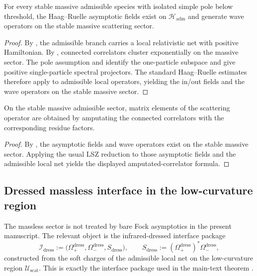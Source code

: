 \begin{theorem}
\label{thm:haag-ruelle-admissible-massive}
For every stable massive admissible species with isolated simple pole below threshold, the
Haag--Ruelle asymptotic fields exist on $\mathcal H_{\mathrm{adm}}$ and generate wave operators on
the stable massive scattering sector.
\end{theorem}

\begin{proof}
By , the admissible
branch carries a local relativistic net with positive Hamiltonian. By
, connected correlators cluster exponentially on the
massive sector. The pole assumption and  identify the
one-particle subspace and give positive single-particle spectral projectors. The standard
Haag--Ruelle estimates therefore apply to admissible local operators, yielding the in/out fields and
the wave operators on the stable massive sector.
\end{proof}

\begin{corollary}
\label{cor:lsz-admissible-massive}
On the stable massive admissible sector, matrix elements of the scattering operator are obtained by
amputating the connected correlators with the corresponding residue factors.
\end{corollary}

\begin{proof}
By , the asymptotic fields and wave operators exist on the
stable massive sector. Applying the usual LSZ reduction to those asymptotic fields and the
admissible local net yields the displayed amputated-correlator formula.
\end{proof}

\subsection{Dressed massless interface in the low-curvature region}

The massless sector is not treated by bare Fock asymptotics in the present manuscript. The relevant
object is the infrared-dressed interface package
\[
\mathcal I_{\mathrm{dress}}
:=
\bigl(\Omega_+^{\mathrm{dress}},\Omega_-^{\mathrm{dress}},S_{\mathrm{dress}}\bigr),
\qquad
S_{\mathrm{dress}}:=(\Omega_+^{\mathrm{dress}})^\ast\Omega_-^{\mathrm{dress}},
\]
constructed from the soft charges of the admissible local net on the low-curvature region
$\mathcal U_{\mathrm{scat}}$. This is exactly the interface package used in the main-text theorem
.


